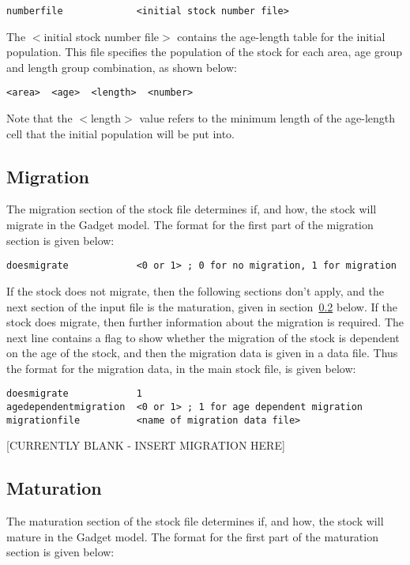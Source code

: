 \documentclass [a4paper, 10pt]{book}
\begin{document}
{\small\begin{verbatim}
numberfile             <initial stock number file>
\end{verbatim}}

The $<$initial stock number file$>$ contains the age-length table for the initial population.  This file specifies the population of the stock for each area, age group and length group combination, as shown below:

{\small\begin{verbatim}
<area>  <age>  <length>  <number>
\end{verbatim}}

Note that the $<$length$>$ value refers to the minimum length of the age-length cell that the initial population will be put into.

\subsection{Migration}\label{subsec:stockmigrate}
The migration section of the stock file determines if, and how, the stock will migrate in the Gadget model. The format for the first part of the migration section is given below:

{\small\begin{verbatim}
doesmigrate            <0 or 1> ; 0 for no migration, 1 for migration
\end{verbatim}}

If the stock does not migrate, then the following sections don't apply, and the next section of the input file is the maturation, given in section~\ref{subsec:stockmature} below.  If the stock does migrate, then further information about the migration is required.  The next line contains a flag to show whether the migration of the stock is dependent on the age of the stock, and then the migration data is given in a data file.  Thus the format for the migration data, in the main stock file, is given below:

{\small\begin{verbatim}
doesmigrate            1
agedependentmigration  <0 or 1> ; 1 for age dependent migration
migrationfile          <name of migration data file>
\end{verbatim}}

[CURRENTLY BLANK - INSERT MIGRATION HERE]

\subsection{Maturation}\label{subsec:stockmature}
The maturation section of the stock file determines if, and how, the stock will mature in the Gadget model. The format for the first part of the maturation section is given below:
\end{document}
